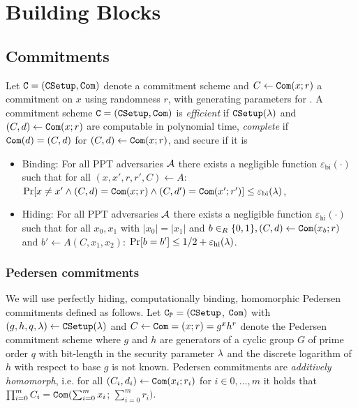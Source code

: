 \section{Building Blocks}

\subsection{Commitments}
Let $\mathtt{C}=(\mathtt{CSetup},\mathtt{Com})$ denote a commitment scheme and $C\gets\mathtt{Com}(x;r)$ a commitment on $x$ using randomness $r$, with \SetupC generating parameters for \Commitment.
A commitment scheme $\mathtt{C}=(\mathtt{CSetup},\mathtt{Com})$ is \emph{efficient} if $\mathtt{CSetup}(\lambda)$ and $(C,d)\gets\mathtt{Com}(x;r)$ are computable in polynomial time, \emph{complete} if $\mathtt{Com}(d)=(C,d)$ for $(C,d)\gets\mathtt{Com}(x;r)$, and secure if it is
\begin{itemize}
  \item Binding: For all PPT adversaries $\mathcal{A}$ there exists a negligible function $\varepsilon_{\mathrm{bi}}(\cdot)$ such that for all $(x,x',r,r',C)\gets A$:
    $\Pr[x\not=x'\wedge (C,d)=\mathtt{Com}(x;r)\wedge (C,d')=\mathtt{Com}(x';r')] \leq \varepsilon_{\mathrm{bi}}(\lambda)$,
  \item Hiding: For all PPT adversaries $\mathcal{A}$ there exists a negligible function $\varepsilon_{\mathrm{hi}}(\cdot)$ such that for all $x_0,x_1$ with $|x_0|=|x_1|$ and $b\in_R\{0,1\}, (C,d)\gets\mathtt{Com}(x_b;r)$ and $b'\gets A(C,x_1,x_2)$:
    $\Pr[b=b'] \leq 1/2+\varepsilon_{\mathrm{hi}}(\lambda)$.
\end{itemize}

\subsubsection{Pedersen commitments \cite{Pedersen91}}
We will use perfectly hiding, computationally binding, homomorphic Pedersen commitments \cite{Pedersen91} defined as follows.
Let $\mathtt{C_P}=(\mathtt{CSetup}$, $\mathtt{Com})$ with $(g,h,q,\lambda)\gets\mathtt{CSetup}(\lambda)$ and $C\gets\mathtt{Com}=(x;r)=g^x h^r$ denote the Pedersen commitment scheme where $g$ and $h$ are generators of a cyclic group $G$ of prime order $q$ with bit-length in the security parameter $\lambda$ and the discrete logarithm of $h$ with respect to base $g$ is not known.
Pedersen commitments are \emph{additively homomorph}, i.e. for all $(C_i,d_i) \gets \mathtt{Com}(x_i;r_i)$ for $i\in0,\dots,m$ it holds that $\prod_{i=0}^{m}C_i=\mathtt{Com}(\sum_{i=0}^{m}x_i$; $\sum_{i=0}^{m}r_i)$.

